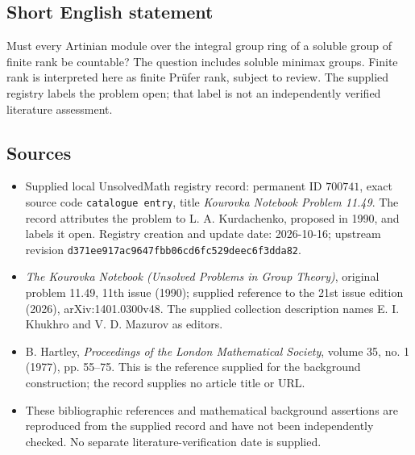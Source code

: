 \documentclass[11pt]{article}
\begin{document}
\subsection{Short English statement}
Must every Artinian module over the integral group ring of a soluble group of finite rank be countable? The question includes soluble minimax groups. Finite rank is interpreted here as finite Pr\"ufer rank, subject to review. The supplied registry labels the problem open; that label is not an independently verified literature assessment.
\subsection{Sources}
\begin{itemize}
\item Supplied local UnsolvedMath registry record: permanent ID \(700741\), exact source code \texttt{catalogue entry}, title \emph{Kourovka Notebook Problem 11.49}. The record attributes the problem to L. A. Kurdachenko, proposed in 1990, and labels it open. Registry creation and update date: 2026-10-16; upstream revision \texttt{d371ee917ac9647fbb06cd6fc529deec6f3dda82}.
\item \emph{The Kourovka Notebook (Unsolved Problems in Group Theory)}, original problem 11.49, 11th issue (1990); supplied reference to the 21st issue edition (2026), arXiv:1401.0300v48. The supplied collection description names E. I. Khukhro and V. D. Mazurov as editors.
\item B. Hartley, \emph{Proceedings of the London Mathematical Society}, volume 35, no. 1 (1977), pp. 55--75. This is the reference supplied for the background construction; the record supplies no article title or URL.
\item These bibliographic references and mathematical background assertions are reproduced from the supplied record and have not been independently checked. No separate literature-verification date is supplied.
\end{itemize}
\end{document}
